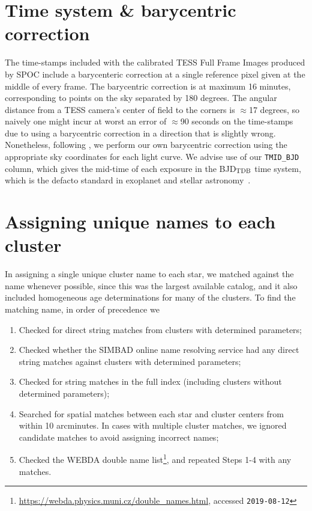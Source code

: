 \documentclass[12pt,twocolumn,tighten,trackchanges]{aastex62}
\begin{document}
\clearpage
\newpage

                            
 

\appendix
\section{Time system \& barycentric correction}
\label{appendix:time}

The time-stamps included with the calibrated TESS Full Frame Images
produced by SPOC include a barycenteric correction at
a single reference pixel given at the middle of every frame.
The barycentric correction is at maximum 16 minutes, corresponding to
points on the sky separated by 180 degrees.
The angular distance from a TESS camera's center of field to the corners
is $\approx$17 degrees, so naively one might incur at worst an error of
$\approx$90 seconds on the time-stamps due to using a barycentric
correction in a direction that is slightly wrong.
Nonetheless, following
\citet{bouma_wasp-4b_2019},
we perform our own barycentric correction using the appropriate
sky coordinates for each light curve.
We advise use of our \texttt{TMID\_BJD} column, which gives the
mid-time of each exposure in the BJD$_{\rm TDB}$ time system, which
is the defacto standard in exoplanet and stellar
astronomy~\citep{eastman_achieving_2010}.

\section{Assigning unique names to each cluster}
\label{appendix:uniquenames}

In assigning a single unique cluster name to each star, we matched
against the \citet{Kharchenko_et_al_2013} name whenever possible,
since this was the largest available catalog, and it also included
homogeneous age determinations for many of the clusters.
To find the matching name, in order of precedence we
\begin{enumerate}
  \item Checked for direct string matches from
    \citet{Kharchenko_et_al_2013} clusters with determined parameters;
  \item Checked whether the SIMBAD online name resolving service \citep{wenger_simbad_2000} had
    any direct string matches against \citet{Kharchenko_et_al_2013}
    clusters with determined parameters;
  \item Checked for string matches in the full
    \citet{Kharchenko_et_al_2013} index (including clusters without
    determined parameters);
  \item Searched for spatial matches between each star and cluster
    centers from \citet{Kharchenko_et_al_2013} within 10 arcminutes.
    In cases with multiple cluster matches, we ignored candidate
    matches to avoid assigning incorrect names;
  \item Checked the WEBDA double name
    list\footnote{\url{https://webda.physics.muni.cz/double_names.html}, accessed \texttt{2019-08-12}},
    and repeated Steps 1-4 with any matches.
\end{enumerate}
\end{document}
